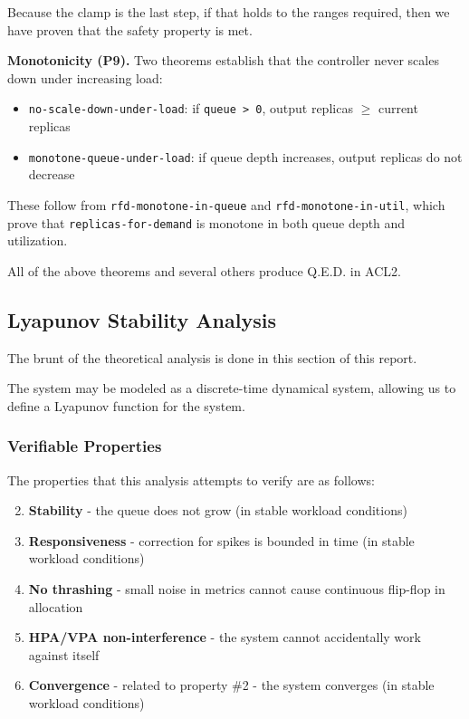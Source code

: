 \documentclass[twocolumn]{article}
\begin{document}
\begin{enumerate}
Because the clamp is the last step, if that holds to the ranges required, then we have proven that the safety property is met.

\textbf{Monotonicity (P9).} Two theorems establish that the controller never scales down under increasing load:

\begin{itemize}
\item \texttt{no-scale-down-under-load}: if \texttt{queue > 0}, output replicas \(\geq\) current replicas
\item \texttt{monotone-queue-under-load}: if queue depth increases, output replicas do not decrease
\end{itemize}

These follow from \texttt{rfd-monotone-in-queue} and \texttt{rfd-monotone-in-util}, which prove that \texttt{replicas-for-demand} is monotone in both queue depth and utilization.

All of the above theorems and several others produce Q.E.D. in ACL2.
\end{enumerate}
\subsection{Lyapunov Stability Analysis}
\label{sec:org77164aa}
\label{sec:lyapunov}

The brunt of the theoretical analysis is done in this section of this report.

The system may be modeled as a discrete-time dynamical system, allowing us to define a Lyapunov function for the system.
\subsubsection{Verifiable Properties}
\label{sec:orgc39e6fd}

The properties that this analysis attempts to verify are as follows:

\begin{enumerate}
\setcounter{enumi}{1}
\item \textbf{Stability} - the queue does not grow (in stable workload conditions)
\item \textbf{Responsiveness} - correction for spikes is bounded in time (in stable workload conditions)
\item \textbf{No thrashing} - small noise in metrics cannot cause continuous flip-flop in allocation
\item \textbf{HPA/VPA non-interference} - the system cannot accidentally work against itself
\setcounter{enumi}{7}
\item \textbf{Convergence} - related to property \#2 - the system converges (in stable workload conditions)
\end{enumerate}
\end{document}
